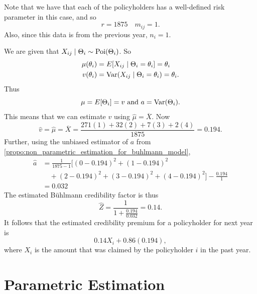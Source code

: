 \documentclass[notoc,notitlepage]{tufte-book}
\begin{document}
\begin{solution}
  Note that we have that each of the policyholders has a well-defined
  risk parameter in this case, and so
  \begin{equation*}
    r = 1875 \quad m_{ij} = 1.
  \end{equation*}
  Also, since this data is from the previous year, $n_i = 1$.

  We are given that $X_{ij} \mid \Theta_i \sim \operatorname{Poi}(\Theta_i)$.
  So
  \begin{align*}
    \mu(\theta_i) &= E[X_{ij} \mid \Theta_i = \theta_i] = \theta_i \\
    v(\theta_i) &= \operatorname{Var}(X_{ij} \mid \Theta_i = \theta_i) = \theta_i.
  \end{align*}
  Thus
  \begin{equation*}
    \mu = E[\Theta_i] = v \text{ and } a = \operatorname{Var}(\Theta_i).
  \end{equation*}
  This means that we can estimate $v$ using $\hat{\mu} = \overline{X}$.
  Now
  \begin{equation*}
    \hat{v} = \hat{\mu} = \overline{X}
      = \frac{271(1) + 32(2) + 7(3) + 2(4)}{1875} = 0.194.
  \end{equation*}
  Further, using the unbiased estimator of $a$ from
  \cref{propo:non_parametric_estimation_for_buhlmann_model},
  \begin{align*}
    \hat{a} &= \frac{1}{1875 - 1} [ (0 - 0.194)^2 + (1 - 0.194)^2 \\
            &\quad+ (2 - 0.194)^2 + (3 - 0.194)^2 + (4 - 0.194)^2 ] -
              \frac{0.194}{1} \\
            &= 0.032
  \end{align*}
  The estimated Bühlmann credibility factor is thus
  \begin{equation*}
    \hat{Z} = \frac{1}{1 + \frac{0.194}{0.032}} = 0.14.
  \end{equation*}
  It follows that the estimated credibility premium for a policyholder
  for next year is
  \begin{equation*}
    0.14 X_{i} + 0.86 (0.194),
  \end{equation*}
  where $X_{i}$ is the amount that was claimed by the policyholder $i$ 
  in the past year.
\end{solution}


\section{Parametric Estimation}%
\label{sec:parametric_estimation}
\end{document}
